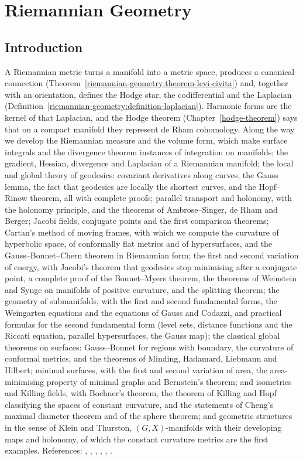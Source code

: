 \chapter{Riemannian Geometry}\label{riemannian-geometry}

\section{Introduction}\label{riemannian-geometry:section-introduction}

A Riemannian metric turns a manifold into a metric space, produces a canonical connection (Theorem~\ref{riemannian-geometry:theorem-levi-civita})
and, together with an orientation, defines the Hodge star, the codifferential and the Laplacian
(Definition~\ref{riemannian-geometry:definition-laplacian}). Harmonic forms are the kernel of that Laplacian, and the Hodge theorem
(Chapter~\ref{hodge-theorem}) says that on a compact manifold they represent de Rham cohomology. Along the way we develop the Riemannian measure and the volume form, which make surface integrals and the divergence theorem instances of integration on
manifolds; the gradient, Hessian, divergence and Laplacian of a Riemannian manifold; the local and global theory of geodesics: covariant derivatives along curves,
the Gauss lemma, the fact that geodesics are locally the shortest curves, and the Hopf--Rinow theorem, all with complete proofs; parallel transport and holonomy, with the holonomy principle, and the
theorems of Ambrose--Singer, de Rham and Berger; Jacobi fields, conjugate points and the first comparison theorems; Cartan's method of moving frames, with which we compute the curvature of hyperbolic
space, of conformally flat metrics and of hypersurfaces, and the Gauss--Bonnet--Chern theorem in Riemannian form; the first and second variation of energy, with Jacobi's theorem that
geodesics stop minimising after a conjugate point, a complete proof of the Bonnet--Myers theorem, the theorems of Weinstein and Synge on manifolds of positive curvature, and the splitting theorem; the geometry of submanifolds, with the
first and second fundamental forms, the Weingarten equations and the equations of Gauss and Codazzi, and practical formulas for the second fundamental form (level sets, distance functions and the Riccati equation, parallel hypersurfaces, the Gauss map); the classical global theorems on surfaces: Gauss--Bonnet for
regions with boundary, the curvature of conformal metrics, and the theorems of Minding, Hadamard, Liebmann and Hilbert; minimal surfaces, with the first and second variation of area, the
area-minimising property of minimal graphs and Bernstein's theorem; and isometries and Killing fields, with Bochner's theorem, the theorem of Killing
and Hopf classifying the spaces of constant curvature, and the statements of Cheng's maximal diameter theorem and of the sphere theorem; and geometric structures in the sense of Klein and Thurston, $(G, X)$-manifolds with their
developing maps and holonomy, of which the constant curvature metrics are the first examples. References:
\cite{do-carmo-riemannian}, \cite{lee-riemannian}, \cite{kobayashi-nomizu}, \cite{joyce-special-holonomy}, \cite{warner-foundations}, \cite[Chapter 0]{griffiths-harris}.

